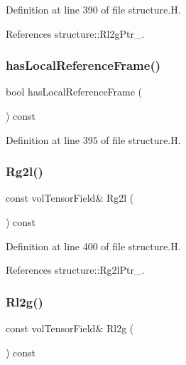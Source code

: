 Definition at line 390 of file structure.\+H.



References structure\+::\+Rl2g\+Ptr\+\_\+.

\mbox{\label{classFoam_1_1structure_a5a3d010cf4cd69644e72fa59863407cd}} 
\subsubsection{\texorpdfstring{has\+Local\+Reference\+Frame()}{hasLocalReferenceFrame()}}
{\footnotesize\ttfamily bool has\+Local\+Reference\+Frame (\begin{DoxyParamCaption}{ }\end{DoxyParamCaption}) const\hspace{0.3cm}{\ttfamily [inline]}}



Definition at line 395 of file structure.\+H.

\mbox{\label{classFoam_1_1structure_a1badf9a3cb26af2f18f59c7a0c9408fa}} 
\subsubsection{\texorpdfstring{Rg2l()}{Rg2l()}}
{\footnotesize\ttfamily const vol\+Tensor\+Field\& Rg2l (\begin{DoxyParamCaption}{ }\end{DoxyParamCaption}) const\hspace{0.3cm}{\ttfamily [inline]}}



Definition at line 400 of file structure.\+H.



References structure\+::\+Rg2l\+Ptr\+\_\+.

\mbox{\label{classFoam_1_1structure_af8fc9f8f08164248e643e6ba949f5fb0}} 
\subsubsection{\texorpdfstring{Rl2g()}{Rl2g()}}
{\footnotesize\ttfamily const vol\+Tensor\+Field\& Rl2g (\begin{DoxyParamCaption}{ }\end{DoxyParamCaption}) const\hspace{0.3cm}{\ttfamily [inline]}}



